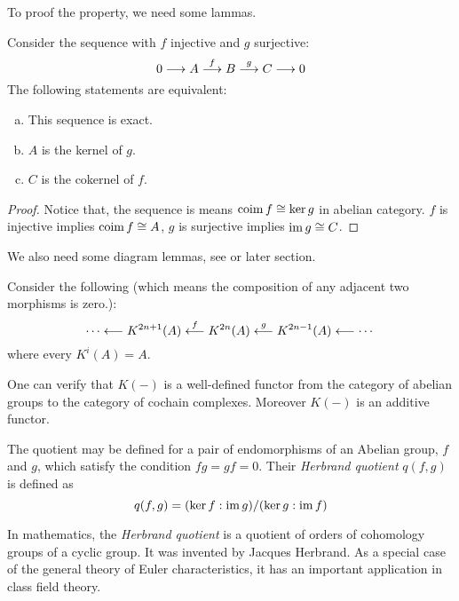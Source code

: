 To proof the property, we need some lammas.
\begin{lem}\label{exactsq}
  Consider the sequence with $f$ injective and $g$ surjective:
    \begin{equation*}
      0\longrightarrow A\stackrel{{f}}{\longrightarrow} B\stackrel{{g}}{\longrightarrow} C\longrightarrow 0
    \end{equation*}
  The following statements are equivalent:
  \begin{enumerate}[a)]
    \setlength{\itemindent}{2ex}
    \item This sequence is exact.
    \item $A$ is the kernel of $g$.
    \item $C$ is the cokernel of $f$.
  \end{enumerate}
\end{lem}
\begin{proof}
  Notice that,  the sequence is  means $\operatorname{coim} f\cong\ker g$ in abelian category. $f$ is injective implies $\operatorname{coim} f\cong A$, $g$ is surjective implies $\operatorname{im} g\cong C$.
\end{proof}

We also need some diagram lemmas, see \cite{lane1998categories} or later section.


Consider the following  (which means the composition of any adjacent two morphisms is zero.):
\begin{equation*}
  \cdots\longleftarrow K^{2n+1}(A)\stackrel{{f}}{\longleftarrow}K^{2n}(A)\stackrel{{g}}{\longleftarrow}K^{2n-1}(A)\longleftarrow\cdots
\end{equation*}
where every $K^i(A)=A$.

One can verify that $K(-)$ is a well-defined functor from the category of abelian groups to the category of cochain complexes. Moreover $K(-)$ is an additive functor.



The quotient may be defined for a pair of endomorphisms of an Abelian group, $f$ and $g$, which satisfy the condition $fg=gf=0$. Their \emph{\red  Herbrand quotient} $q(f,g)$ is defined as
\begin{equation*}
  q(f,g)=(\ker f:\operatorname{im} g)/(\ker g:\operatorname{im} f)
\end{equation*}

In mathematics, the \emph{\red  Herbrand quotient} is a quotient of orders of cohomology groups of a cyclic group. It was invented by Jacques Herbrand. As a special case of the general theory of Euler characteristics, it has an important application in class field theory.

